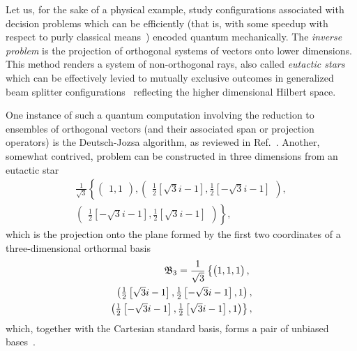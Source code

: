 \documentclass[%
 preprint,
 showpacs,
 showkeys,
 preprintnumbers,
 amsmath,amssymb,
 aps,
  pra,
  longbibliography,
 ]{revtex4-1}
\begin{document}

Let us, for the sake of a physical example,
study configurations associated with decision problems which can be efficiently
(that is, with some speedup with respect to purly classical means~\cite{svozil-2016-vector}) encoded quantum mechanically.
The {\em inverse problem} is the projection of orthogonal systems of vectors onto lower dimensions.
This method renders a system of non-orthogonal rays, also called {\it eutactic stars}~\cite{schlaefli-1901,hadwiger-40,coxeter-polytopes,seidel-76,hasse-stachel96}
which can be effectively levied to mutually exclusive outcomes in
generalized beam splitter
configurations~\cite{rzbb,zukowski-97}
reflecting the higher dimensional Hilbert space.

One instance of such a quantum computation involving the reduction to ensembles of orthogonal vectors (and their associated
span or projection operators) is the Deutsch-Jozsa algorithm, as reviewed in Ref.~\cite{svozil-2016-vector}.
Another, somewhat contrived, problem can be constructed in three dimensions from an eutactic star
\begin{equation}
\begin{aligned}
 \frac{1}{\sqrt{3}} \left\{
 \begin{pmatrix}1,1\end{pmatrix},
 \begin{pmatrix}\frac{1}{2} \left[{\sqrt{3}} i-1\right] , \frac{1}{2} \left[-{\sqrt{3}} i-1\right] \end{pmatrix}, \right. \\
\left.
\begin{pmatrix}  \frac{1}{ 2} \left[-{\sqrt{3}} i-1\right] , \frac{1}{ 2} \left[{\sqrt{3}} i-1\right]  \end{pmatrix}
   \right\} ,
\end{aligned}
\end{equation}
which is the projection onto the plane formed by the first two coordinates
of a three-dimensional orthormal basis
\begin{equation}
\begin{aligned}
   {\frak B}_3 = \frac{1}{\sqrt{3}} \left\{
 \begin{pmatrix}1,1,1\end{pmatrix},\right. \\
 \begin{pmatrix}\frac{1}{2} \left[{\sqrt{3}} i-1\right] , \frac{1}{2} \left[-{\sqrt{3}} i-1\right] ,
  1\end{pmatrix}, \\
\left.
\begin{pmatrix}
 \frac{1}{ 2} \left[-{\sqrt{3}} i-1\right] , \frac{1}{ 2} \left[{\sqrt{3}} i-1\right] , 1  \end{pmatrix}
   \right\} ,
\end{aligned}
\end{equation}
which, together with the Cartesian standard basis, forms a pair of unbiased bases~\cite{Schwinger.60}.
\end{document}
